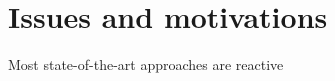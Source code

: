 
\section{Issues and motivations}
\label{sec:motivations}

Most state-of-the-art approaches are reactive